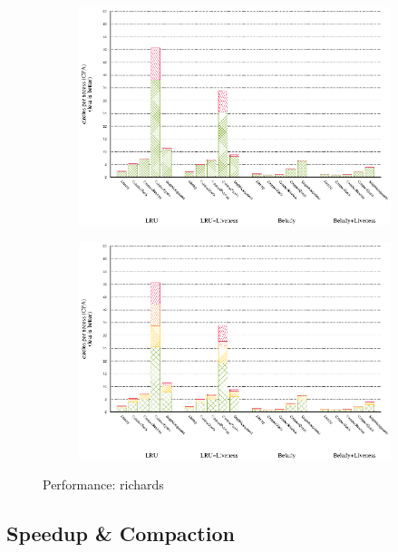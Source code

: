 \begin{figure}[!ht]
  \begin{subfigure}[b]{0.5\textwidth}%
    \includegraphics[width=\textwidth]{figs/plots/perf-misses-richards.eps}
  \end{subfigure}%
  \begin{subfigure}[b]{0.5\textwidth}%
    \includegraphics[width=\textwidth]{figs/plots/perf-richards.eps}
  \end{subfigure}%
  \caption{Performance: richards}
  \label{fig:performance-richards}
\end{figure}

\subsection{Speedup \& Compaction}\label{app:experiment-speedup-compaction}

